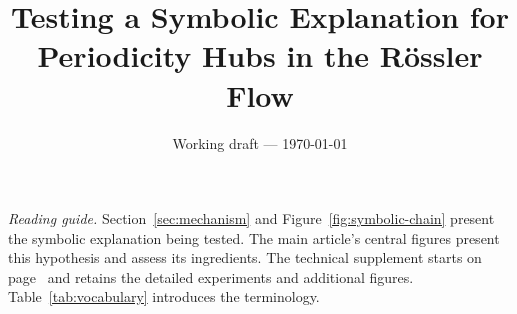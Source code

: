 \documentclass[11pt]{article}
\title{Testing a Symbolic Explanation for\\Periodicity Hubs in the R{\"o}ssler Flow}
\author{}
\date{Working draft --- \today}
\begin{document}
\maketitle

\begin{abstract}

\end{abstract}

\noindent\small
\textit{Reading guide.} Section~\ref{sec:mechanism} and
Figure~\ref{fig:symbolic-chain} present the symbolic explanation being tested.
The main article's central figures present this hypothesis and
assess its ingredients. The technical supplement starts on
page~\pageref{supp:start} and retains the detailed experiments and additional
figures. Table~\ref{tab:vocabulary} introduces the terminology.
\normalsize










\clearpage
\appendix
\setcounter{figure}{0}
\renewcommand{\thefigure}{S\arabic{figure}}
\renewcommand{\theHfigure}{supp.\arabic{figure}}
\setcounter{table}{0}
\renewcommand{\thetable}{S\arabic{table}}
\renewcommand{\theHtable}{supp.\arabic{table}}
\setcounter{equation}{0}
\renewcommand{\theequation}{S\arabic{equation}}
\renewcommand{\theHequation}{supp.\arabic{equation}}








\clearpage



\end{document}

